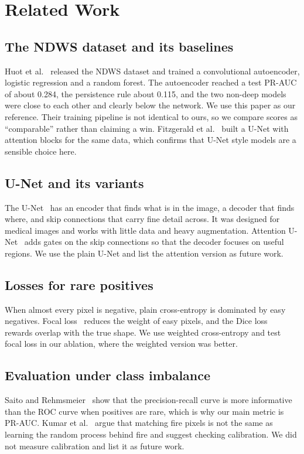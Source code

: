 \documentclass[10pt,letterpaper,twocolumn]{article}
\begin{document}
\section{Related Work}
\subsection{The NDWS dataset and its baselines}
Huot et al.~\cite{huot2022} released the NDWS dataset and trained a
convolutional autoencoder, logistic regression and a random forest. The
autoencoder reached a test PR-AUC of about 0.284, the persistence rule about
0.115, and the two non-deep models were close to each other and clearly below
the network. We use this paper as our reference. Their training pipeline is not
identical to ours, so we compare scores as ``comparable'' rather than claiming a
win. Fitzgerald et al.~\cite{fitzgerald2023} built a U-Net with attention blocks
for the same data, which confirms that U-Net style models are a sensible choice
here.

\subsection{U-Net and its variants}
The U-Net~\cite{ronneberger2015} has an encoder that finds what is in the image,
a decoder that finds where, and skip connections that carry fine detail across.
It was designed for medical images and works with little data and heavy
augmentation. Attention U-Net~\cite{oktay2018} adds gates on the skip
connections so that the decoder focuses on useful regions. We use the plain
U-Net and list the attention version as future work.

\subsection{Losses for rare positives}
When almost every pixel is negative, plain cross-entropy is dominated by easy
negatives. Focal loss~\cite{lin2017} reduces the weight of easy pixels, and the
Dice loss~\cite{milletari2016} rewards overlap with the true shape. We use
weighted cross-entropy and test focal loss in our ablation, where the weighted
version was better.

\subsection{Evaluation under class imbalance}
Saito and Rehmsmeier~\cite{saito2015} show that the precision-recall curve is
more informative than the ROC curve when positives are rare, which is why our
main metric is PR-AUC. Kumar et al.~\cite{kumar2025} argue that matching fire
pixels is not the same as learning the random process behind fire and suggest
checking calibration. We did not measure calibration and list it as future work.
\end{document}
